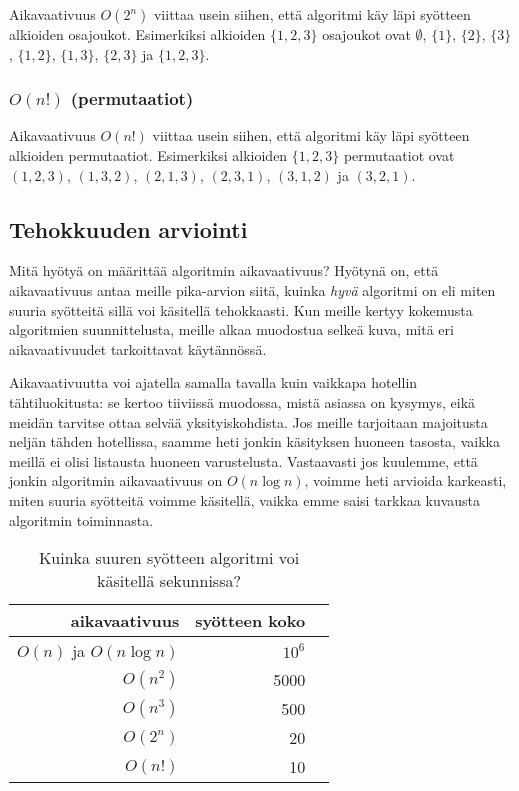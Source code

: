 Aikavaativuus $O(2^n)$ viittaa usein siihen,
että algoritmi käy läpi syötteen alkioiden osajoukot.
Esimerkiksi alkioiden $\{1,2,3\}$ osajoukot ovat
$\emptyset$, $\{1\}$, $\{2\}$, $\{3\}$, $\{1,2\}$, $\{1,3\}$, $\{2,3\}$ ja $\{1,2,3\}$.

\subsubsection{$O(n!)$ (permutaatiot)}

Aikavaativuus $O(n!)$ viittaa usein siihen,
että algoritmi käy läpi syötteen alkioiden permutaatiot.
Esimerkiksi alkioiden $\{1,2,3\}$ permutaatiot ovat
$(1,2,3)$, $(1,3,2)$, $(2,1,3)$, $(2,3,1)$, $(3,1,2)$ ja $(3,2,1)$.

\subsection{Tehokkuuden arviointi}

Mitä hyötyä on määrittää algoritmin aikavaativuus?
Hyötynä on, että aikavaativuus antaa meille pika-arvion siitä,
kuinka \emph{hyvä} algoritmi on eli miten suuria syötteitä
sillä voi käsitellä tehokkaasti.
Kun meille kertyy kokemusta algoritmien suunnittelusta,
meille alkaa muodostua selkeä kuva,
mitä eri aikavaativuudet tarkoittavat käytännössä.

Aikavaativuutta voi ajatella samalla tavalla kuin vaikkapa
hotellin tähti\-luokitusta: se kertoo tiiviissä muodossa,
mistä asiassa on kysymys, eikä mei\-dän tarvitse ottaa selvää yksityiskohdista.
Jos meille tarjoitaan majoitusta neljän tähden hotellissa,
saamme heti jonkin käsityksen huoneen tasosta,
vaikka meillä ei olisi listausta huoneen varustelusta.
Vastaavasti jos kuulemme, että jonkin algoritmin aikavaativuus on $O(n \log n)$,
voimme heti arvioida karkeasti, miten suuria syötteitä voimme käsitellä,
vaikka emme saisi tarkkaa kuvausta algoritmin toiminnasta.

\begin{table}
\center
\begin{tabular}{rrr}
aikavaativuus & syötteen koko \\
\hline
$O(n)$ ja $O(n \log n)$ & $10^6$ & \\
$O(n^2)$ & 5000 & \\
$O(n^3)$ & 500 & \\
$O(2^n)$ & 20 & \\
$O(n!)$ & 10 & \\
\end{tabular}
\caption{Kuinka suuren syötteen algoritmi voi käsitellä sekunnissa?}
\label{tab:algteh}
\end{table}

